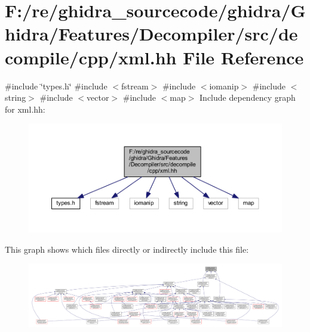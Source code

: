 \hypertarget{xml_8hh}{}\section{F\+:/re/ghidra\+\_\+sourcecode/ghidra/\+Ghidra/\+Features/\+Decompiler/src/decompile/cpp/xml.hh File Reference}
\label{xml_8hh}
{\ttfamily \#include \char`\"{}types.\+h\char`\"{}}\newline
{\ttfamily \#include $<$fstream$>$}\newline
{\ttfamily \#include $<$iomanip$>$}\newline
{\ttfamily \#include $<$string$>$}\newline
{\ttfamily \#include $<$vector$>$}\newline
{\ttfamily \#include $<$map$>$}\newline
Include dependency graph for xml.\+hh\+:
\nopagebreak
\begin{figure}[H]
\begin{center}
\leavevmode
\includegraphics[width=350pt]{xml_8hh__incl}
\end{center}
\end{figure}
This graph shows which files directly or indirectly include this file\+:
\nopagebreak
\begin{figure}[H]
\begin{center}
\leavevmode
\includegraphics[width=350pt]{xml_8hh__dep__incl}
\end{center}
\end{figure}

